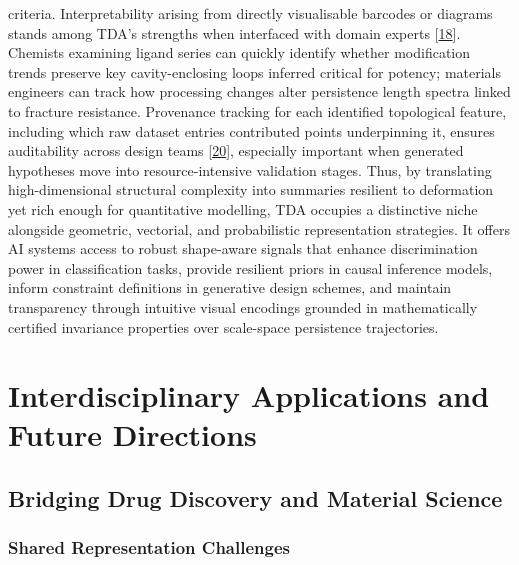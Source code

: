 \documentclass[
]{article}
\begin{document}
criteria. Interpretability arising from directly visualisable barcodes
or diagrams stands among TDA's strengths when interfaced with domain
experts {[}\hyperref[_bookmark58]{18}{]}. Chemists examining ligand
series can quickly identify whether modification trends preserve key
cavity-enclosing loops inferred critical for potency; materials
engineers can track how processing changes alter persistence length
spectra linked to fracture resistance. Provenance tracking for each
identified topological feature, including which raw dataset entries
contributed points underpinning it, ensures auditability across design
teams {[}\hyperref[_bookmark60]{20}{]}, especially important when
generated hypotheses move into resource-intensive validation stages.
Thus, by translating high-dimensional structural complexity into
summaries resilient to deformation yet rich enough for quantitative
modelling, TDA occupies a distinctive niche alongside geometric,
vectorial, and probabilistic representation strategies. It offers AI
systems access to robust shape-aware signals that enhance discrimination
power in classification tasks, provide resilient priors in causal
inference models, inform constraint definitions in generative design
schemes, and maintain transparency through intuitive visual encodings
grounded in mathematically certified invariance properties over
scale-space persistence trajectories.

\section{Interdisciplinary Applications and Future
Directions}\label{interdisciplinary-applications-and-future-directions}

\subsection{Bridging Drug Discovery and Material
Science}\label{bridging-drug-discovery-and-material-science}

\subsubsection{Shared Representation
Challenges}\label{shared-representation-challenges}
\end{document}

